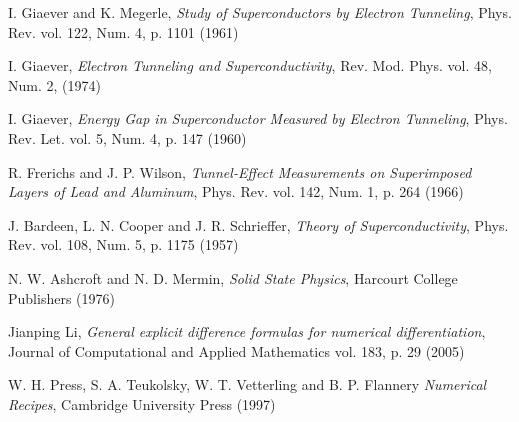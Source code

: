 \documentclass[twocolumn, twoside,a4paper,10pt]{article}
\begin{document}
\begin{thebibliography}{99}

 I. Giaever and K. Megerle, \emph{Study of Superconductors by Electron Tunneling}, Phys. Rev. vol. 122, Num. 4, p. 1101 (1961)

 I. Giaever, \emph{Electron Tunneling and Superconductivity}, Rev. Mod. Phys. vol. 48, Num. 2, (1974)

 I. Giaever, \emph{Energy Gap in Superconductor Measured by Electron Tunneling}, Phys. Rev. Let. vol. 5, Num. 4, p. 147 (1960)

 R. Frerichs and J. P. Wilson, \emph{Tunnel-Effect Measurements on Superimposed Layers of Lead and Aluminum}, Phys. Rev. vol. 142, Num. 1, p. 264 (1966)

 J. Bardeen, L. N. Cooper and J. R. Schrieffer, \emph{Theory of Superconductivity}, Phys. Rev. vol. 108, Num. 5, p. 1175 (1957)

 N. W. Ashcroft and N. D. Mermin, \emph{Solid State Physics}, Harcourt College Publishers (1976)

 Jianping Li, \emph{General explicit difference formulas for numerical differentiation}, Journal of Computational and Applied Mathematics vol. 183, p. 29 (2005)

 W. H. Press, S. A. Teukolsky, W. T. Vetterling and B. P. Flannery \emph{Numerical Recipes},  Cambridge University Press (1997)



\end{thebibliography}

\ednotemessage
\end{document}
